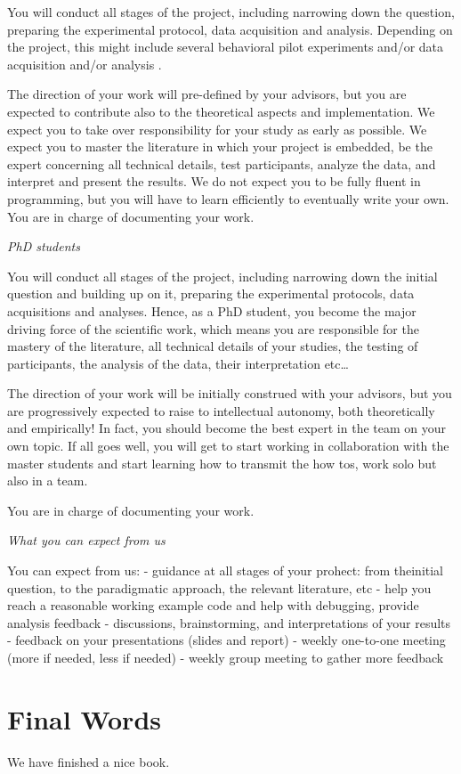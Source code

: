 \documentclass[]{book}
\begin{document}
You will conduct all stages of the project, including narrowing down the question, preparing the experimental protocol, data acquisition and analysis.
Depending on the project, this might include several behavioral pilot experiments and/or data acquisition and/or analysis .

The direction of your work will pre-defined by your advisors, but you are expected to contribute also to the theoretical aspects and implementation.
We expect you to take over responsibility for your study as early as possible.
We expect you to master the literature in which your project is embedded, be the expert concerning all technical details, test participants, analyze the data, and interpret and present the results.
We do not expect you to be fully fluent in programming, but you will have to learn efficiently to eventually write your own.
You are in charge of documenting your work.

\emph{PhD students}

You will conduct all stages of the project, including narrowing down the initial question and building up on it, preparing the experimental protocols, data acquisitions and analyses. Hence, as a PhD student, you become the major driving force of the scientific work, which means you are responsible for the mastery of the literature, all technical details of your studies, the testing of participants, the analysis of the data, their interpretation etc\ldots{}

The direction of your work will be initially construed with your advisors, but you are progressively expected to raise to intellectual autonomy, both theoretically and empirically! In fact, you should become the best expert in the team on your own topic. If all goes well, you will get to start working in collaboration with the master students and start learning how to transmit the how tos, work solo but also in a team.

You are in charge of documenting your work.

\emph{What you can expect from us}

You can expect from us:
- guidance at all stages of your prohect: from theinitial question, to the paradigmatic approach, the relevant literature, etc
- help you reach a reasonable working example code and help with debugging, provide analysis feedback
- discussions, brainstorming, and interpretations of your results
- feedback on your presentations (slides and report)
- weekly one-to-one meeting (more if needed, less if needed)
- weekly group meeting to gather more feedback

\hypertarget{final-words}{%
\chapter{Final Words}\label{final-words}}

We have finished a nice book.


\end{document}
